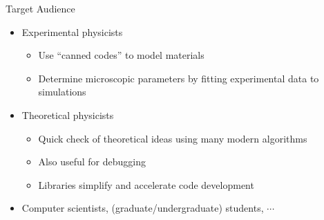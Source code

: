 \begin{frame}[t,fragile]{Target Audience}
  \begin{itemize}
    \setlength{\itemsep}{1em}
  \item Experimental physicists
    \begin{itemize}
    \item Use ``canned codes'' to model materials
    \item Determine microscopic parameters by fitting experimental data to simulations
    \end{itemize}
  \item Theoretical physicists
    \begin{itemize}
    \item Quick check of theoretical ideas using many modern algorithms
    \item Also useful for debugging
    \item Libraries simplify and accelerate code development
    \end{itemize}
  \item Computer scientists, (graduate/undergraduate) students, $\cdots$
  \end{itemize}
\end{frame}


